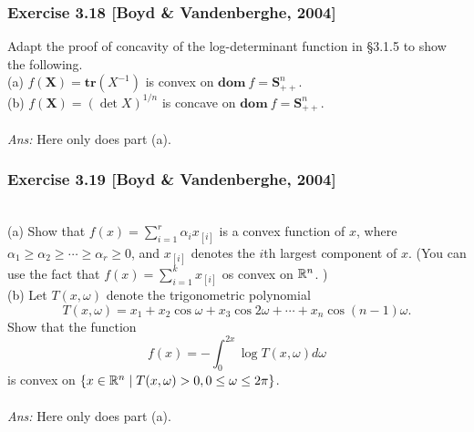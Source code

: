 \documentclass[12pt,a4paper]{article}
\newcommand{\INT}[2]{\int_{#1}^{#2}}
\newcommand\dom{\mathbf{dom\:}}
\def\R{\ifmmode\mathbb R\fi}
\def\vS{\mathbf{S}}
\def\vX{\mathbf{X}}
\begin{document}
\subsubsection*{Exercise 3.18 [Boyd \& Vandenberghe, 2004]}
\noindent Adapt the proof of concavity of the log-determinant function in \S 3.1.5 to show the following. \\
(a) $f(\vX) = \mathbf{tr}(X^{-1})$ is convex on $\dom f = \vS^n_{++}$.\\
(b) $f(\vX) = (\det X)^{1/n}$ is concave on $\dom f = \vS^n_{++}$.\\
\\
{\it Ans:} Here only does part (a). 



\newpage\subsubsection*{Exercise 3.19 [Boyd \& Vandenberghe, 2004]}
 \\
(a) Show that $f(x) = \sum^r_{i=1}\alpha_ix_{[i]}$ is a convex function of $x$, where $\alpha_1 \geq \alpha_2 \geq \cdots \geq \alpha_r \geq 0$, and $x_{[i]}$ denotes the $i$th largest component of $x$. (You can use the fact that $f(x) = \sum_{i=1}^k x_{[i]}$ os convex on $\R^n$. )\\
(b) Let $T(x, \omega)$ denote the trigonometric polynomial
$$T(x,\omega) = x_1 + x_2 \cos\omega + x_3\cos2\omega + \cdots + x_n\cos(n-1)\omega.$$
Show that the function
$$f(x) = -\INT0{2x} \log T(x,\omega)d\omega$$
is convex on $\{x \in \R^n \mid T(x,\omega)>0, 0\leq \omega \leq 2\pi\}$. \\
\\
{\it Ans:} Here only does part (a). 
\end{document}

